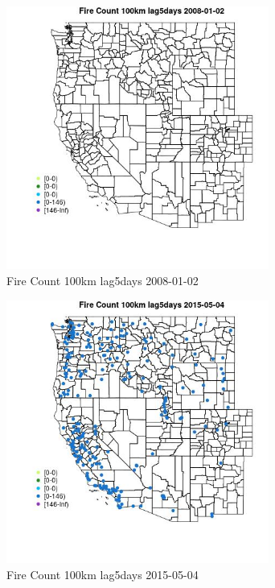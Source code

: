 \begin{figure} 
\centering  
\includegraphics[width=0.77\textwidth]{Code_Outputs/Report_ML_input_PM25_Step4_part_e_de_duplicated_aves_compiled_2019-05-18wNAs_MapObsFire_Count_100km_lag5days2008-01-02.jpg} 
\caption{\label{fig:Report_ML_input_PM25_Step4_part_e_de_duplicated_aves_compiled_2019-05-18wNAsMapObsFire_Count_100km_lag5days2008-01-02}Fire Count 100km lag5days 2008-01-02} 
\end{figure} 
 

\begin{figure} 
\centering  
\includegraphics[width=0.77\textwidth]{Code_Outputs/Report_ML_input_PM25_Step4_part_e_de_duplicated_aves_compiled_2019-05-18wNAs_MapObsFire_Count_100km_lag5days2015-05-04.jpg} 
\caption{\label{fig:Report_ML_input_PM25_Step4_part_e_de_duplicated_aves_compiled_2019-05-18wNAsMapObsFire_Count_100km_lag5days2015-05-04}Fire Count 100km lag5days 2015-05-04} 
\end{figure} 
 

